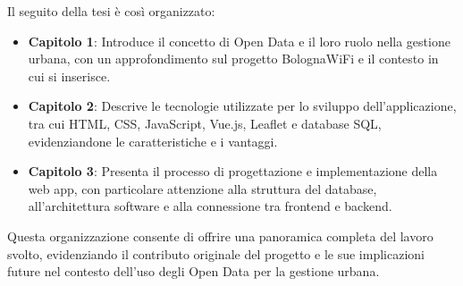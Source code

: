 Il seguito della tesi è così organizzato:

\begin{itemize}
    \item \textbf{Capitolo 1}: Introduce il concetto di Open Data e il loro ruolo nella gestione urbana, con un approfondimento sul progetto BolognaWiFi e il contesto in cui si inserisce.
    \item \textbf{Capitolo 2}: Descrive le tecnologie utilizzate per lo sviluppo dell'applicazione, tra cui HTML, CSS, JavaScript, Vue.js, Leaflet e database SQL, evidenziandone le caratteristiche e i vantaggi.
    \item \textbf{Capitolo 3}: Presenta il processo di progettazione e implementazione della web app, con particolare attenzione alla struttura del database, all'architettura software e alla connessione tra frontend e backend.
\end{itemize}

Questa organizzazione consente di offrire una panoramica completa del lavoro svolto, evidenziando il contributo originale del progetto e le sue implicazioni future nel contesto dell'uso degli Open Data per la gestione urbana.

\clearpage{\pagestyle{empty}\cleardoublepage}